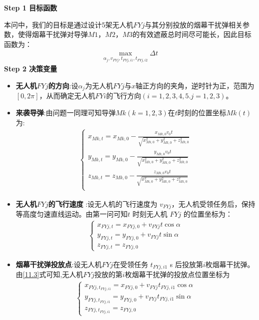 \documentclass[../main.tex]{subfiles}
\begin{document}
\noindent \textbf{Step 1 目标函数}
\par 本问中，我们的目标是通过设计5架无人机$FYj$与其分别投放的烟幕干扰弹相关参数，使得烟幕干扰弹对导弹$M1$，$M2$，$M3$的有效遮蔽总时间尽可能长，因此目标函数为：
\begin{align}\label{11.1}
  \underset{\alpha _j,v_{FYj},t_{FYj,i1},t_{FYj,i2}}{\max}\Delta t
\end{align}
\noindent \textbf{Step 2 决策变量}

\begin{itemize}
\item \textbf{无人机$FYj$的方向}:设$\alpha_j$为无人机$FYj$与$x$轴正方向的夹角，逆时针为正，范围为$\left[ 0,2\pi \right] $，从而确定无人机$FYi$的飞行方向$(i=1,2,3,4,5.j=1,2,3)$。

\item \textbf{来袭导弹}:由问题一同理可知导弹$Mk(k=1,2,3)$在$t$时刻的位置坐标$Mk\left( t \right)$为:
\begin{align}
	\left\{ \begin{array}{l}
	x_{Mk,t}=x_{Mk,0}-\frac{x_{Mk,0}v_0t}{\sqrt{x_{Mk,0}^{2}+y_{Mk,0}^{2}+z_{Mk,0}^{2}}}\\
	y_{Mk,t}=y_{Mk,0}-\frac{y_{Mk,0}v_0t}{\sqrt{x_{Mk,0}^{2}+y_{Mk,0}^{2}+z_{Mk,0}^{2}}}\\
	z_{Mk,t}=z_{Mk,0}-\frac{z_{Mk,0}v_0t}{\sqrt{x_{Mk,0}^{2}+y_{Mk,0}^{2}+z_{Mk,0}^{2}}}\\
\end{array} \right. 
\end{align}
\item  \textbf{无人机$FYj$的飞行速度} :设无人机的飞行速度为 \( v_{FYj} \)，无人机受领任务后，保持等高度匀速直线运动。由第一问可知\( t \) 时刻无人机 \( FYj \) 的位置坐标为：
\begin{align}\label{11.3}
\begin{cases}
x_{FYj,t} = x_{FYj,0} + v_{FYj} t \cos\alpha \\
y_{FYj,t} = y_{FYj,0} + v_{FYj} t \sin\alpha \\
z_{FYj,t} = z_{FYj,0}
\end{cases}
\end{align}
\item \textbf{烟幕干扰弹投放点}:设无人机$FYj$在受领任务 \( t_{FYj,i1} \) s 后投放第$i$枚烟幕干扰弹。 由\eqref{11.3}式可知,无人机$FYj$投放的第$i$枚烟幕干扰弹的投放点位置坐标为
\begin{align}
\begin{cases}
x_{FYj,t_{FYj,i1}} = x_{FYj,0} + v_{FYj} t_{FYj,i1} \cos\alpha \\
y_{FYj,t_{FYj,i1}} = y_{FYj,0} + v_{FYj} t_{FYj,i1} \sin\alpha \\
z_{FYj,t_{FYj,i1}} = z_{FYj,0}
\end{cases}
\end{align}


\end{itemize}
\end{document}
